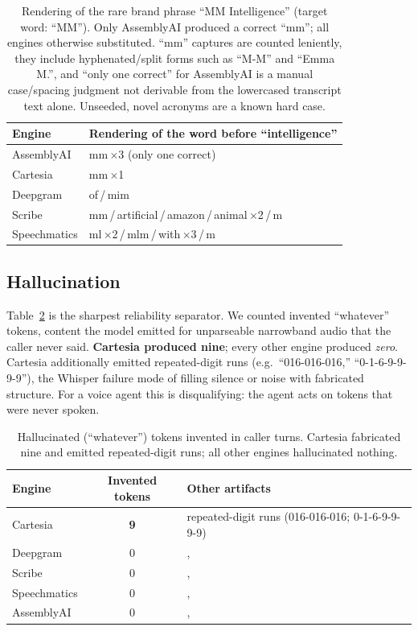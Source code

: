 \documentclass[11pt]{article}
\begin{document}
\begin{table}[ht]
\centering
\small
\begin{tabular}{@{}ll@{}}
\toprule
\textbf{Engine} & \textbf{Rendering of the word before ``intelligence''} \\
\midrule
AssemblyAI & mm\,$\times$3 (only one correct) \\
Cartesia & mm\,$\times$1 \\
Deepgram & of\,/\,mim \\
Scribe & mm\,/\,artificial\,/\,amazon\,/\,animal\,$\times$2\,/\,m \\
Speechmatics & ml\,$\times$2\,/\,mlm\,/\,with\,$\times$3\,/\,m \\
\bottomrule
\end{tabular}
\caption{Rendering of the rare brand phrase ``MM Intelligence'' (target word:
``MM''). Only AssemblyAI produced a correct ``mm''; all engines otherwise
substituted. ``mm'' captures are counted leniently, they include
hyphenated/split forms such as ``M-M'' and ``Emma M.'', and ``only one
correct'' for AssemblyAI is a manual case/spacing judgment not derivable from
the lowercased transcript text alone. Unseeded, novel acronyms are a known hard
case.}
\label{tab:brand}
\end{table}

\subsection{Hallucination}
\label{sec:halluc}

Table~\ref{tab:halluc} is the sharpest reliability separator. We counted
invented ``whatever'' tokens, content the model emitted for unparseable
narrowband audio that the caller never said. \textbf{Cartesia produced nine};
every other engine produced \emph{zero}. Cartesia additionally emitted
repeated-digit runs (e.g.\ ``016-016-016,'' ``0-1-6-9-9-9-9''), the Whisper
failure mode of filling silence or noise with fabricated structure. For a voice
agent this is disqualifying: the agent acts on tokens that were never spoken.

\begin{table}[ht]
\centering
\small
\begin{tabular}{@{}lcl@{}}
\toprule
\textbf{Engine} & \textbf{Invented tokens} & \textbf{Other artifacts} \\
\midrule
Cartesia & \textbf{9} & repeated-digit runs (016-016-016; 0-1-6-9-9-9-9) \\
Deepgram & 0 &, \\
Scribe & 0 &, \\
Speechmatics & 0 &, \\
AssemblyAI & 0 &, \\
\bottomrule
\end{tabular}
\caption{Hallucinated (``whatever'') tokens invented in caller turns. Cartesia
fabricated nine and emitted repeated-digit runs; all other engines hallucinated
nothing.}
\label{tab:halluc}
\end{table}
\end{document}
